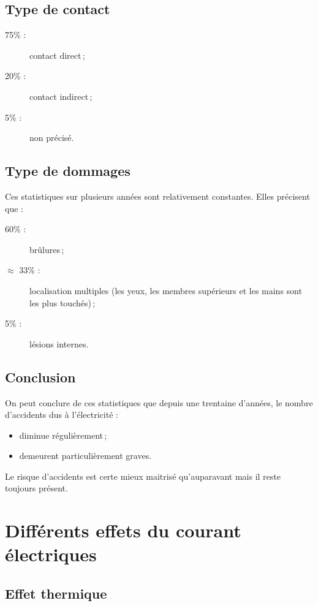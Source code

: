 \subsection{Type de contact}

\begin{description}
\item[75\% :] contact direct\,;
\item[20\% :] contact indirect\,;
\item[5\% :] non précisé.
\end{description}

\subsection{Type de dommages}

Ces statistiques sur plusieurs années sont relativement constantes. Elles précisent que :
\begin{description}
\item[60\% :] brûlures\,;
\item[$\approx$ 33\% :] localisation multiples (les yeux, les membres supérieurs et les mains sont les plus touchés)\,;
\item[5\% :] lésions internes.
\end{description}

\subsection{Conclusion}

On peut conclure de ces statistiques que depuis une trentaine d'années, le nombre d'accidents dus à l'électricité :
\begin{itemize}
\item diminue régulièrement\,;
\item demeurent particulièrement graves.
\end{itemize}

Le risque d'accidents est certe mieux maitrisé qu'auparavant mais il reste toujours présent.

\section{Différents effets du courant électriques\label{sec:effet_courant_électrique}}

\subsection{Effet thermique}

